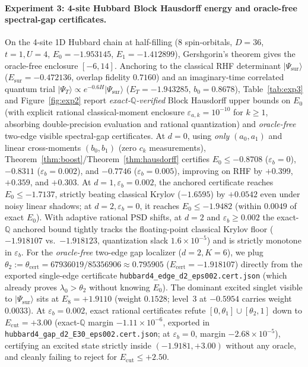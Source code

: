 \documentclass[11pt,a4paper]{article}
\theoremstyle{definition}
\newcommand{\Q}{\mathbb{Q}}
\newcommand{\ket}[1]{\lvert #1 \rangle}
\begin{document}
\paragraph{Experiment 3: 4-site Hubbard Block Hausdorff energy and oracle-free spectral-gap certificates.}
On the 4-site 1D Hubbard chain at half-filling ($8$ spin-orbitals, $D = 36$, $t=1, U=4$, $E_0 = -1.953145$, $E_1 = -1.412899$), Gershgorin's theorem gives the oracle-free enclosure $[-6, 14]$. Anchoring to the classical RHF determinant $\ket{\Psi_{\mathrm{sur}}}$ ($E_{\mathrm{sur}} = -0.472136$, overlap fidelity $0.7160$) and an imaginary-time correlated quantum trial $\ket{\Psi_T} \propto e^{-0.6 H}\ket{\Psi_{\mathrm{sur}}}$ ($E_T = -1.943285$, $b_0 = 0.8678$), Table~\ref{tab:exp3} and Figure~\ref{fig:exp2} report \emph{exact-$\Q$-verified} Block Hausdorff upper bounds on $E_0$ (with explicit rational classical-moment enclosure $\varepsilon_{a,k} = 10^{-10}$ for $k \ge 1$, absorbing double-precision evaluation and rational quantization) and \emph{oracle-free} two-edge visible spectral-gap certificates.
At $d=0$, using \emph{only} $(a_0, a_1)$ and linear cross-moments $(b_0, b_1)$ (zero $c_k$ measurements), Theorem~\ref{thm:boost}/Theorem~\ref{thm:hausdorff} certifies $E_0 \le -0.8708$ ($\varepsilon_b = 0$), $-0.8311$ ($\varepsilon_b = 0.002$), and $-0.7746$ ($\varepsilon_b = 0.005$), improving on RHF by $+0.399$, $+0.359$, and $+0.303$. At $d=1, \varepsilon_b=0.002$, the anchored certificate reaches $E_0 \le -1.7137$, strictly beating classical Krylov ($-1.6595$) by $+0.0542$ even under noisy linear shadows; at $d=2, \varepsilon_b=0$, it reaches $E_0 \le -1.9482$ (within $0.0049$ of exact $E_0$). With adaptive rational PSD shifts, at $d=2$ and $\varepsilon_b \ge 0.002$ the exact-$\Q$ anchored bound tightly tracks the floating-point classical Krylov floor ($-1.918107$ vs.\ $-1.918123$, quantization slack $1.6\times 10^{-5}$) and is strictly monotone in $\varepsilon_b$.
For the \emph{oracle-free} two-edge gap localizer ($d=2, K=6$), we plug $\theta_2 := \theta_{\mathrm{cert}} = 67936019/85356906 \approx 0.795905$ ($E_{\mathrm{cert}} = -1.918107$) directly from the exported single-edge certificate \texttt{hubbard4\_edge\_d2\_eps002.cert.json} (which already proves $\lambda_0 > \theta_2$ without knowing $E_0$). The dominant excited singlet visible to $\ket{\Psi_{\mathrm{sur}}}$ sits at $E_8 = +1.9110$ (weight $0.1528$; level~3 at $-0.5954$ carries weight $0.0033$). At $\varepsilon_b = 0.002$, exact rational certificates refute $[0, \theta_1] \cup [\theta_2, 1]$ down to $E_{\mathrm{cut}} = +3.00$ (exact-$\Q$ margin $-1.11\times 10^{-6}$, exported in \texttt{hubbard4\_gap\_d2\_E30\_eps002.cert.json}; at $\varepsilon_b = 0$, margin $-2.68\times 10^{-5}$), certifying an excited state strictly inside $(-1.9181, +3.00)$ without any oracle, and cleanly failing to reject for $E_{\mathrm{cut}} \le +2.50$.
\end{document}
